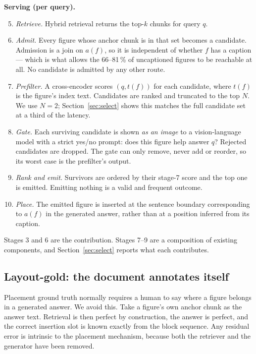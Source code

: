 \documentclass[journal]{IEEEtran}
\begin{document}
\textbf{Serving (per query).}
\begin{enumerate}\setcounter{enumi}{4}
\item \emph{Retrieve.} Hybrid retrieval returns the top-$k$ chunks for query $q$.
\item \emph{Admit.} Every figure whose anchor chunk is in that set becomes a
candidate. Admission is a join on $a(f)$, so it is independent of whether $f$ has
a caption --- which is what allows the 66--81\,\% of uncaptioned figures to be
reachable at all. No candidate is admitted by any other route.
\item \emph{Prefilter.} A cross-encoder scores $(q, t(f))$ for each candidate,
where $t(f)$ is the figure's index text. Candidates are ranked and truncated to
the top $N$. We use $N = 2$; Section~\ref{sec:select} shows this matches the full
candidate set at a third of the latency.
\item \emph{Gate.} Each surviving candidate is shown \emph{as an image} to a
vision-language model with a strict yes/no prompt: does this figure help answer
$q$? Rejected candidates are dropped. The gate can only remove, never add or
reorder, so its worst case is the prefilter's output.
\item \emph{Rank and emit.} Survivors are ordered by their stage-7 score and the
top one is emitted. Emitting nothing is a valid and frequent outcome.
\item \emph{Place.} The emitted figure is inserted at the sentence boundary
corresponding to $a(f)$ in the generated answer, rather than at a position
inferred from its caption.
\end{enumerate}

Stages 3 and 6 are the contribution. Stages 7--9 are a composition of existing
components, and Section~\ref{sec:select} reports what each contributes.

\subsection{Layout-gold: the document annotates itself}

Placement ground truth normally requires a human to say where a figure belongs in
a generated answer. We avoid this. Take a figure's own anchor chunk as the answer
text. Retrieval is then perfect by construction, the answer is perfect, and the
correct insertion slot is known exactly from the block sequence. Any residual
error is intrinsic to the placement mechanism, because both the retriever and the
generator have been removed.
\end{document}
